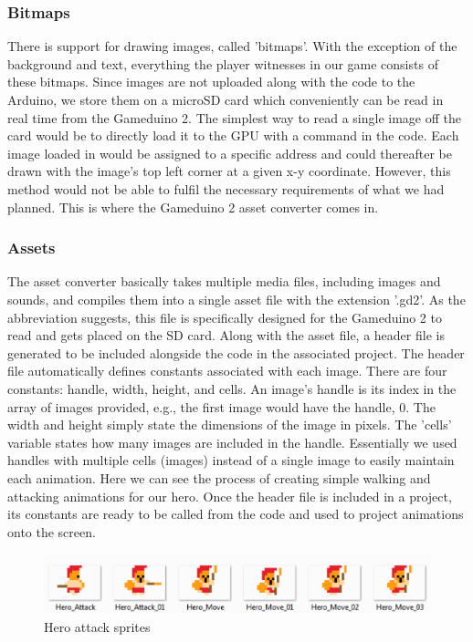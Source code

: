 \subsubsection*{Bitmaps}
 There is support for drawing images, called 'bitmaps'. With the exception of the background and text, everything the player witnesses in our game consists of these bitmaps. Since images are not uploaded along with the code to the Arduino, we store them on a microSD card which conveniently can be read in real time from the Gameduino 2. The simplest way to read a single image off the card would be to directly load it to the GPU with a command in the code. Each image loaded in would be assigned to a specific address and could thereafter be drawn with the image's top left corner at a given x-y coordinate. However, this method would not be able to fulfil the necessary requirements of what we had planned. This is where the Gameduino 2 asset converter comes in.

\subsubsection*{Assets}
The asset converter basically takes multiple media files, including images and sounds, and compiles them into a single asset file with the extension '.gd2'. As the abbreviation suggests, this file is specifically designed for the Gameduino 2 to read and gets placed on the SD card. Along with the asset file, a header file is generated to be included alongside the code in the associated project. The header file automatically defines constants associated with each image. There are four constants: handle, width, height, and cells. An image's handle is its index in the array of images provided, e.g., the first image would have the handle, 0. The width and height simply state the dimensions of the image in pixels. The 'cells' variable states how many images are included in the handle. Essentially we used handles with multiple cells (images) instead of a single image to easily maintain each animation. Here we can see the process of creating simple walking and attacking animations for our hero. Once the header file is included in a project, its constants are ready to be called from the code and used to project animations onto the screen.


\begin{figure}[h]
  \centering
  \includegraphics[scale=1]{Figures/HeroAttack}
  \caption{Hero attack sprites}
  \label{fig:Hero_Attak}
\end{figure}

